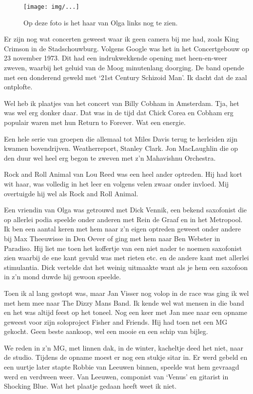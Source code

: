 \documentclass[12pt,twoside]{memoir}
\begin{document}
\begin{figure}[t]
\texttt{[image: img/...]}
\caption{Op deze foto is het haar van Olga links nog te zien.}
\end{figure}

Er zijn nog wat concerten geweest waar ik geen camera bij me had, zoals King Crimson in de Stadschouwburg. Volgens Google was het in het Concertgebouw op 23 november 1973. Dit had een indrukwekkende opening met heen-en-weer zweven, waarbij het geluid van de Moog minutenlang doorging. De band opende met een donderend geweld met `21st Century Schizoid Man'. Ik dacht dat de zaal ontplofte.

Wel heb ik plaatjes van het concert van Billy Cobham in Amsterdam. Tja, het was wel erg donker daar. Dat was in de tijd dat Chick Corea en Cobham erg populair waren met hun Return to Forever. Wat een energie. 

Een hele serie van groepen die allemaal tot Miles Davis terug te herleiden zijn kwamen bovendrijven. Weatherreport, Stanley Clark. Jon MacLaughlin die op den duur wel heel erg begon te zweven met z’n Mahavishnu Orchestra.

Rock and Roll Animal van Lou Reed was een heel ander optreden. Hij had kort wit haar, was volledig in het leer en volgens velen zwaar onder invloed. Mij overtuigde hij wel als Rock and Roll Animal.

Een vriendin van Olga was getrouwd met Dick Vennik, een bekend saxofonist die op allerlei podia speelde onder anderen met Rein de Graaf en in het Metropool. Ik ben een aantal keren met hem naar z’n eigen optreden geweest onder andere bij Max Theeuwisse in Den Oever of ging met hem naar Ben Webster in Paradiso. Hij liet me toen het koffertje van een niet nader te noemen saxofonist zien waarbij de ene kant gevuld was met rieten etc. en de andere kant met allerlei stimulantia. Dick vertelde dat het weinig uitmaakte want als je hem een saxofoon in z’n mond duwde hij gewoon speelde.

Toen ik al lang gestopt was, maar Jan Visser nog volop in de race was ging ik wel met hem mee naar The Dizzy Mans Band. Ik kende wel wat mensen in die band en het was altijd feest op het toneel. Nog een keer met Jan mee naar een opname geweest voor zijn soloproject Fisher and Friends. Hij had toen net een MG gekocht. Geen beste aankoop, wel een mooie en een schip van bijleg. 

We reden in z’n MG, met linnen dak, in de winter, kacheltje deed het niet, naar de studio. Tijdens de opname moest er nog een stukje sitar in. Er werd gebeld en een uurtje later stapte Robbie van Leeuwen binnen, speelde wat hem gevraagd werd en verdween weer. Van Leeuwen, componist van ‘Venus’ en gitarist in Shocking Blue. Wat het plaatje gedaan heeft weet ik niet.
\end{document}
